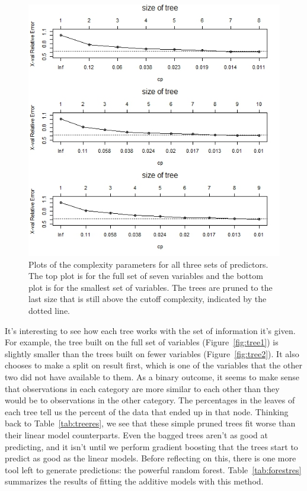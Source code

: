 \documentclass[12pt]{article}\usepackage[]{graphicx}\usepackage[]{color}
\begin{document}
\begin{figure}[h]
\centering
\includegraphics[width=.9\textwidth]{treecp.jpeg}
\captionsetup{font=footnotesize,labelfont=footnotesize}
\caption{\label{fig:treecp} Plots of the complexity parameters for all three sets of predictors. The top plot is for the full set of seven variables and the bottom plot is for the smallest set of variables. The trees are pruned to the last size that is still above the cutoff complexity, indicated by the dotted line.}
\end{figure}

\newpage
It's interesting to see how each tree works with the set of information it's given. For example, the tree built on the full set of variables (Figure~\ref{fig:tree1}) is slightly smaller than the trees built on fewer variables (Figure~\ref{fig:tree2}). It also chooses to make a split on result first, which is one of the variables that the other two did not have available to them. As a binary outcome, it seems to make sense that observations in each category are more similar to each other than they would be to observations in the other category. The percentages in the leaves of each tree tell us the percent of the data that ended up in that node. Thinking back to Table~\ref{tab:treeres}, we see that these simple pruned trees fit worse than their linear model counterparts. Even the bagged trees aren't as good at predicting, and it isn't until we perform gradient boosting that the trees start to predict as good as the linear models. Before reflecting on this, there is one more tool left to generate predictions: the powerful random forest. Table~\ref{tab:forestres} summarizes the results of fitting the additive models with this method.\\
\end{document}
